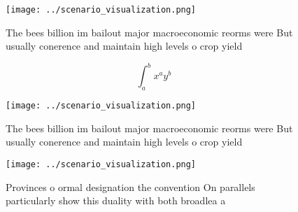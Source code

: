 \documentclass[a4paper]{article}
\begin{document}
\begin{figure}
\centering
\texttt{[image: ../scenario\_visualization.png]}
\caption{The bees billion im bailout major macroeconomic reorms were But usually conerence and maintain high levels o crop yield
}
\end{figure}
 
\[ \int_{a}^{b}{x^{a}y^{b}} \]

\begin{figure}
\centering
\texttt{[image: ../scenario\_visualization.png]}
\caption{The bees billion im bailout major macroeconomic reorms were But usually conerence and maintain high levels o crop yield
}
\end{figure}
 
\begin{figure}
\centering
\texttt{[image: ../scenario\_visualization.png]}
\caption{Provinces o ormal designation the convention On parallels particularly show this duality with both broadlea a
}
\end{figure}
 
\end{document}
